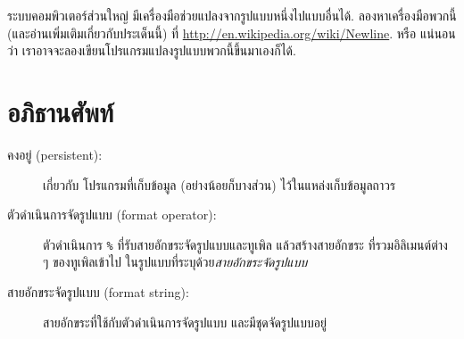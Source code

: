 ระบบคอมพิวเตอร์ส่วนใหญ่
มีเครื่องมือช่วยแปลงจากรูปแบบหนึ่งไปแบบอื่นได้.
ลองหาเครื่องมือพวกนี้ (และอ่านเพิ่มเติมเกี่ยวกับประเด็นนี้) ที่ \url{http://en.wikipedia.org/wiki/Newline}.  
หรือ แน่นอนว่า เราอาจจะลองเขียนโปรแกรมแปลงรูปแบบพวกนี้ขึ้นมาเองก็ได้.


\section{อภิธานศัพท์}

\begin{description}


\item[คงอยู่ (persistent):] เกี่ยวกับ 
โปรแกรมที่เก็บข้อมูล (อย่างน้อยก็บางส่วน) ไว้ในแหล่งเก็บข้อมูลถาวร



\item[ตัวดำเนินการจัดรูปแบบ (format operator):] 
ตัวดำเนินการ \texttt{\%} ที่รับสายอักขระจัดรูปแบบและทูเพิล
แล้วสร้างสายอักขระ ที่รวมอิลิเมนต์ต่าง ๆ ของทูเพิลเข้าไป ในรูปแบบที่ระบุด้วย\textit{สายอักขระจัดรูปแบบ}


\item[สายอักขระจัดรูปแบบ (format string):] 
สายอักขระที่ใช้กับตัวดำเนินการจัดรูปแบบ และมีชุดจัดรูปแบบอยู่



\end{description}
